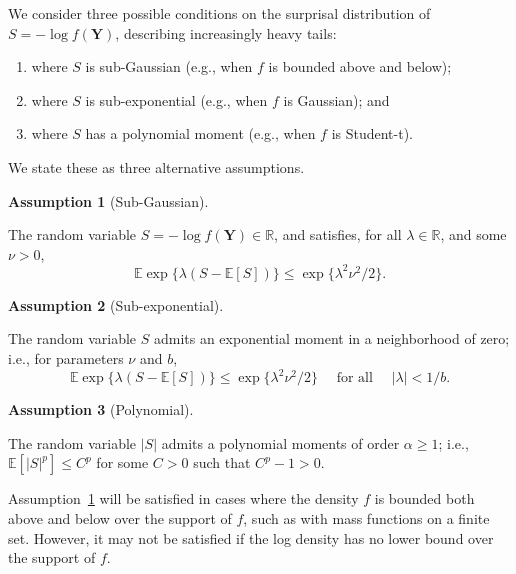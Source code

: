 \documentclass[
  12pt]{article}
\providecommand{\tightlist}{%
  \setlength{\itemsep}{0pt}\setlength{\parskip}{0pt}}
\newcommand{\E}{\mathbb{E}}
\theoremstyle{definition}
\newtheorem{definition}{Assumption}[section]
\theoremstyle{plain}
\theoremstyle{plain}
\theoremstyle{plain}
\theoremstyle{remark}
\begin{document}
We consider three possible conditions on the surprisal distribution of
\(S = -\log f(\bm{Y})\), describing increasingly heavy tails:

\begin{enumerate}
\def\labelenumi{\arabic{enumi}.}
\tightlist
\item
  where \(S\) is sub-Gaussian (e.g., when \(f\) is bounded above and
  below);
\item
  where \(S\) is sub-exponential (e.g., when \(f\) is Gaussian); and
\item
  where \(S\) has a polynomial moment (e.g., when \(f\) is Student-t).
\end{enumerate}

We state these as three alternative assumptions.

\begin{definition}[Sub-Gaussian]\protect\hypertarget{def-bounded}{}\label{def-bounded}

The random variable \(S =-\log f(\bm{Y})\in\mathbb{R}\), and satisfies,
for all \(\lambda\in\mathbb{R}\), and some \(\nu>0\), \[
    \E \exp\{\lambda (S-\E[S])\}\le \exp\{\lambda^2 \nu^2/2\}.
\]

\end{definition}

\begin{definition}[Sub-exponential]\protect\hypertarget{def-subbounded}{}\label{def-subbounded}

The random variable \(S\) admits an exponential moment in a neighborhood
of zero; i.e., for parameters \(\nu\) and \(b\), \[
    \E \exp\{\lambda(S-\E[S])\} \leq \exp\{\lambda^2\nu^2/ 2\} \quad\text{ for all } \quad |\lambda|< 1/b.
\]

\end{definition}

\begin{definition}[Polynomial]\protect\hypertarget{def-polybounded}{}\label{def-polybounded}

The random variable \(|S|\) admits a polynomial moments of order
\(\alpha\ge 1\); i.e., \(\E[|S|^p] \le C^p\) for some \(C>0\) such that
\(C^p-1>0\).

\end{definition}

Assumption~\ref{def-bounded} will be satisfied in cases where the
density \(f\) is bounded both above and below over the support of \(f\),
such as with mass functions on a finite set. However, it may not be
satisfied if the log density has no lower bound over the support of
\(f\).
\end{document}
